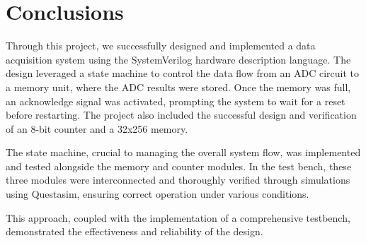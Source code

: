 \documentclass[conference]{IEEEtran}
\begin{document}
	
	\section{Conclusions}
	
	Through this project, we successfully designed and implemented a data acquisition system using the SystemVerilog hardware description language. The design leveraged a state machine to control the data flow from an ADC circuit to a memory unit, where the ADC results were stored. Once the memory was full, an acknowledge signal was activated, prompting the system to wait for a reset before restarting. The project also included the successful design and verification of an 8-bit counter and a 32x256 memory.
	
	The state machine, crucial to managing the overall system flow, was implemented and tested alongside the memory and counter modules. In the test bench, these three modules were interconnected and thoroughly verified through simulations using Questasim, ensuring correct operation under various conditions.
	
	This approach, coupled with the implementation of a comprehensive testbench, demonstrated the effectiveness and reliability of the design.
	
	
	
	
	
	
	
	
	
	
	
	
\end{document}
